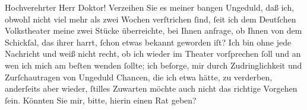 \pstart\center{}Hochverehrter Herr Doktor!\pend\vspace{0.5em}
\pstart
           Verzeihen Sie es meiner bangen Ungeduld, daß ich, obwohl nicht viel mehr als zwei
               Wochen verſtrichen{ }ſind,{ }ſeit ich dem Deutſchen
                  Volkstheater meine zwei Stücke überreichte, bei Ihnen anfrage, ob Ihnen von dem
               Schickſal, das ihrer harrt,{ }ſchon etwas bekannt geworden iſt? Ich bin ohne jede
               Nachricht und weiß nicht recht, ob ich wieder im Theater vorſprechen{ }ſoll und an wen ich mich am beſten
               wenden{ }ſollte; ich beſorge, mir durch Zudringlichkeit und Zurſchautragen von Ungeduld
               Chancen, die ich etwa hätte, zu verderben, anderſeits aber wieder,{ }ſtilles Zuwarten
               möchte auch nicht das {\pb}richtige Vorgehen{ }ſein. Könnten Sie mir, bitte, hierin einen Rat geben?\pend
           
